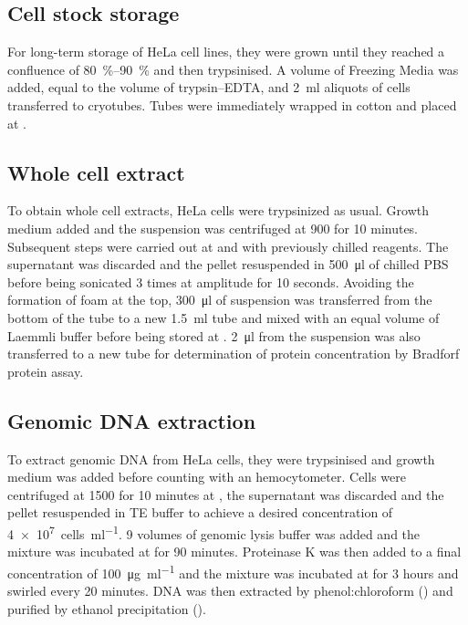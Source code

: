     \subsection{Cell stock storage}
      For long-term storage of HeLa cell lines, they were grown until
      they reached a confluence of \SIrange{80}{90}{\percent} and then
      trypsinised. A volume of Freezing Media was added, equal
      to the volume of trypsin--EDTA, and \SI{2}{\ml} aliquots of
      cells transferred to cryotubes. Tubes were immediately wrapped in
      cotton and placed at .

    \subsection{Whole cell extract}
      \label{sec:cell-extract}
      To obtain whole cell extracts, HeLa cells were trypsinized as usual. Growth
      medium added and the suspension was centrifuged at \SI{900}{\gn}
      for 10 minutes.
      Subsequent steps were carried out at  and with previously
      chilled reagents. The supernatant was discarded and the pellet
      resuspended in \SI{500}{\ul} of chilled PBS before being
      sonicated 3 times at  amplitude for 10 seconds. Avoiding the
      formation of foam at the top, \SI{300}{\ul} of suspension was transferred
      from the bottom of the tube to a new \SI{1.5}{\ml} tube
      and mixed with an equal
      volume of Laemmli buffer before being stored at .
      \SI{2}{\ul} from the suspension was also transferred to a new tube
      for determination of protein concentration by Bradforf protein assay.

    \subsection{Genomic DNA extraction}
      To extract genomic DNA from HeLa cells, they were trypsinised and
      growth medium was added before counting with an hemocytometer.
      Cells were centrifuged at \SI{1500}{\gn} for 10 minutes at , the
      supernatant was discarded
      and the pellet resuspended in TE buffer to achieve
      a desired concentration of \SI{4e7}{cells\per\ml}. 9 volumes of
      genomic lysis buffer was added
      and the mixture was incubated at  for
      90 minutes. Proteinase K was then added to a final concentration of
      \SI{100}{\ug\per\ml} and the mixture was
      incubated at  for 3 hours and
      swirled every 20 minutes. DNA was then extracted by
      phenol:chloroform () and purified by ethanol
      precipitation ().

